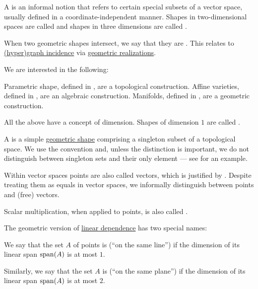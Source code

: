 \begin{definition}\label{rem:geometric_shape}
  A  is an informal notion that refers to certain special subsets of a vector space, usually defined in a coordinate-independent manner. Shapes in two-dimensional spaces are called  and shapes in three dimensions are called .

  When two geometric shapes intersect, we say that they are . This relates to \hyperref[def:hypergraph/incidence]{(hyper)graph incidence} via \hyperref[def:quiver_geometric_realization]{geometric realizations}.

  We are interested in the following:
  \begin{thmenum}
     Parametric shape, defined in , are a topological construction.
     Affine varieties, defined in , are an algebraic construction.
     Manifolds, defined in , are a geometric construction.
  \end{thmenum}

  All the above have a concept of dimension. Shapes of dimension \( 1 \) are called .
\end{definition}

\begin{definition}\label{rem:point}
  A  is a simple \hyperref[rem:geometric_shape]{geometric shape} comprising a singleton subset of a topological space. We use the convention  and, unless the distinction is important, we do not distinguish between singleton sets and their only element --- see  for an example.

  Within vector spaces points are also called vectors, which is justified by . Despite treating them as equals in vector spaces, we informally distinguish between points and (free) vectors.

  Scalar multiplication, when applied to points, is also called .
\end{definition}

\begin{remark}\label{rem:collinear_complanar}
  The geometric version of \hyperref[def:linear_dependence]{linear dependence} has two special names:
  \begin{thmenum}
     We say that the set \( A \) of points is  (\enquote{on the same line}) if the dimension of its linear span \( \operatorname{span}(A) \) is at most \( 1 \).

     Similarly, we say that the set \( A \) is  (\enquote{on the same plane}) if the dimension of its linear span \( \operatorname{span}(A) \) is at most \( 2 \).
  \end{thmenum}
\end{remark}

